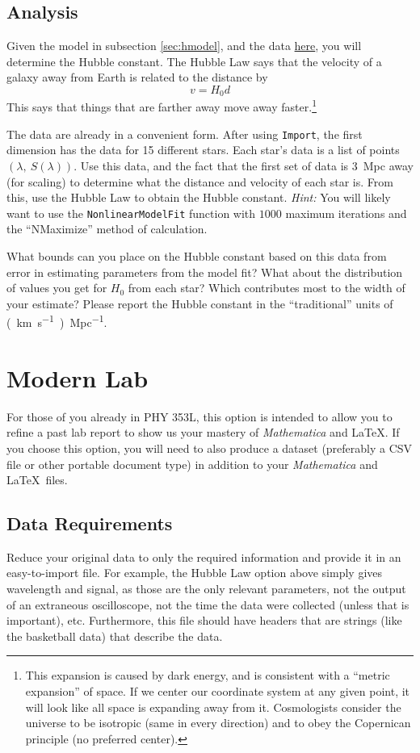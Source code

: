 \documentclass{article}
\begin{document}
\subsection{Analysis}
\label{sec:hanalysis}
Given the model in subsection \ref{sec:hmodel}, and the data \href{http://www.cs.utexas.edu/~evanott/PHY110C_Textbook/static/data_analysis/_downloads/hubble.csv}{here},
you will determine the Hubble constant. The Hubble Law says that the velocity of a galaxy away from Earth is related
to the distance by $$v=H_0d$$ This says that things that are farther away move away faster.\footnote{This expansion is 
caused by dark energy, and is consistent with a ``metric expansion'' of space. If we center our coordinate system at
any given point, it will look like all space is expanding away from it. Cosmologists consider the universe to be
isotropic (same in every direction) and to obey the Copernican principle (no preferred center).}

The data are already in a convenient form. After using \texttt{Import}, the first dimension has the data for 15
different stars. Each star's data is a list of points $(\lambda,~S(\lambda))$. Use this data, and the fact that the first
set of data is \SI{3}{Mpc} away (for scaling) to determine what the distance and velocity of each star is. From this,
use the Hubble Law to obtain the Hubble constant. \textit{Hint:} You will likely want to use the \texttt{NonlinearModelFit} function
with $1000$ maximum iterations and the ``NMaximize'' method of calculation.

What bounds can you place on the Hubble constant based on this data from error in estimating parameters from the model fit? 
What about the distribution of values you get for $H_0$ from each star? Which contributes most to the width of your estimate? Please
report the Hubble constant in the ``traditional'' units of \si{(\kilo\m\per\s)\per Mpc}.

\section{Modern Lab}
\label{sec:modern}
For those of you already in PHY 353L, this option is intended to allow you to refine a past lab report to show us
your mastery of \textit{Mathematica} and \LaTeX. If you choose this option, you will need to also produce a dataset
(preferably a CSV file or other portable document type) in addition to your \textit{Mathematica} and \LaTeX~files.

\subsection{Data Requirements}
Reduce your original data to only the required information and provide it in an easy-to-import file. For example,
the Hubble Law option above simply gives wavelength and signal, as those are the only relevant parameters, not the
output of an extraneous oscilloscope, not the time the data were collected (unless that is important), etc. Furthermore,
this file should have headers that are strings (like the basketball data) that describe the data.
\end{document}
